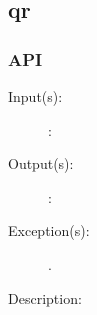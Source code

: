 %
%
%
%
%              

\subsection{qr}
\label{qr}

\subsubsection{API}
\begin{description}
\label{qr_}
\item[{\cfunc[]{qr\_}{}}: ]
	\begin{description}\item[]
	\item[Input(s): ]
		\begin{description}\item[]
		\item[: ]
		\end{description}
	\item[Output(s): ]
		\begin{description}\item[]
		\item[: ]
		\end{description}
	\item[Exception(s): ]
		\begin{description}\item[]
		\item[.]
		\end{description}
	\item[Description: ]
	\end{description}
\end{description}
